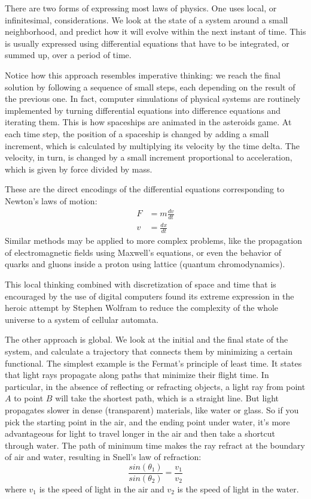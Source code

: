 There are two forms of expressing most laws of physics. One uses local,
or infinitesimal, considerations. We look at the state of a system
around a small neighborhood, and predict how it will evolve within the
next instant of time. This is usually expressed using differential
equations that have to be integrated, or summed up, over a period of
time.

Notice how this approach resembles imperative thinking: we reach the
final solution by following a sequence of small steps, each depending on
the result of the previous one. In fact, computer simulations of
physical systems are routinely implemented by turning differential
equations into difference equations and iterating them. This is how
spaceships are animated in the asteroids game. At each time step, the
position of a spaceship is changed by adding a small increment, which is
calculated by multiplying its velocity by the time delta. The velocity,
in turn, is changed by a small increment proportional to acceleration,
which is given by force divided by mass.

These are the direct encodings of the differential equations
corresponding to Newton's laws of motion:
\[
	\begin{aligned}
		F & = m \frac{dv}{dt} \\
		v & = \frac{dx}{dt}
	\end{aligned}
\]
Similar methods may be applied to more complex problems, like the
propagation of electromagnetic fields using Maxwell's equations, or even
the behavior of quarks and gluons inside a proton using lattice 
(quantum chromodynamics).

This local thinking combined with discretization of space and time that
is encouraged by the use of digital computers found its extreme
expression in the heroic attempt by Stephen Wolfram to reduce the
complexity of the whole universe to a system of cellular automata.

The other approach is global. We look at the initial and the final state
of the system, and calculate a trajectory that connects them by
minimizing a certain functional. The simplest example is the Fermat's
principle of least time. It states that light rays propagate along paths
that minimize their flight time. In particular, in the absence of
reflecting or refracting objects, a light ray from point $A$ to point $B$
will take the shortest path, which is a straight line. But light
propagates slower in dense (transparent) materials, like water or glass.
So if you pick the starting point in the air, and the ending point under
water, it's more advantageous for light to travel longer in the air and
then take a shortcut through water. The path of minimum time makes the
ray refract at the boundary of air and water, resulting in Snell's law
of refraction:
\begin{equation*}
	\frac{sin(\theta_1)}{sin(\theta_2)} = \frac{v_1}{v_2}
\end{equation*}
where $v_1$ is the speed of light in the air and $v_2$ is
the speed of light in the water.


